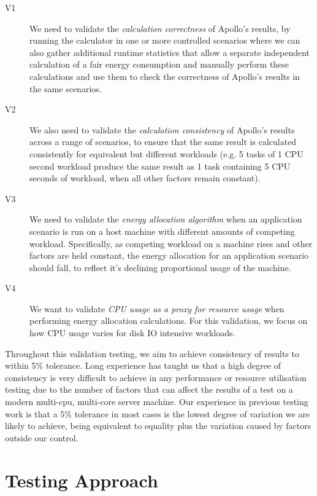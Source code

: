 \begin{description}
\item [V1] We need to validate the \emph{calculation correctness} of Apollo's results, by running the calculator in one or more controlled scenarios where we can also gather additional runtime statistics that allow a separate independent calculation of a fair energy consumption and manually perform these calculations and use them to check the correctness of Apollo's results in the same scenarios.

\item [V2] We also need to validate the \emph{calculation consistency} of Apollo's results across a range of scenarios, to ensure that the same result is calculated consistently for equivalent but different workloads (e.g. 5 tasks of 1 CPU second workload produce the same result as 1 task containing 5 CPU seconds of workload, when all other factors remain constant).

\item [V3] We need to validate the \emph{energy allocation algorithm} when an application scenario is run on a host machine with different amounts of competing workload.  Specifically, as competing workload on a machine rises and other factors are held constant, the energy allocation for an application scenario should fall, to reflect it's declining proportional usage of the machine.

\item [V4] We want to validate \emph{CPU usage as a proxy for resource usage} when performing energy allocation calculations.  For this validation, we focus on how CPU usage varies for disk IO intensive workloads.

\end{description}

Throughout this validation testing, we aim to achieve consistency of results to within 5\% tolerance.  Long experience has taught us that a high degree of consistency is very difficult to achieve in any performance or resource utilisation testing due to the number of factors that can affect the results of a test on a modern multi-cpu, multi-core server machine.  Our experience in previous testing work is that a 5\% tolerance in most cases is the lowest degree of variation we are likely to achieve, being equivalent to equality plus the variation caused by factors outside our control.

\section{Testing Approach}

